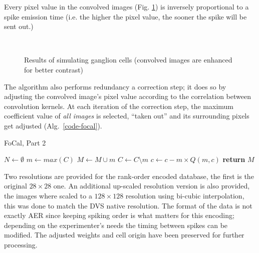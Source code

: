 Every pixel value in the convolved images (Fig. \ref{fig-convolution-results}) 
is inversely proportional to a spike emission time (i.e. the higher the pixel value, the sooner the spike will be sent out.)

\begin{figure}[hbt]
  \centering
  \\
  \caption{Results of simulating ganglion cells (convolved images are enhanced for better contrast)}
  \label{fig-convolution-results}
\end{figure}
The algorithm also performs redundancy a correction step; it does so by 
adjusting the convolved image's pixel value according to the correlation 
between convolution kernels. At each iteration of the correction step, the 
maximum coefficient value of \emph{all images} is selected, ``taken out'' and its 
surrounding pixels get adjusted (Alg.~\ref{code-focal}).
\begin{algorithm}[h]
  \caption{FoCal, Part 2}
  \label{code-focal-corr}
  \begin{algorithmic}
    \State $N \leftarrow \emptyset$ 
    \Repeat
    \State $m \leftarrow max(C)$
    \State $M \leftarrow M \cup m$
    \State $C \leftarrow C \setminus m$
     
     
    \State $c \leftarrow c - m \times Q(m, c)$
    \EndIf
    \EndFor
    \State \textbf{return} $M$
    \EndProcedure
  \end{algorithmic}
\end{algorithm}
Two resolutions are provided for the rank-order encoded database, the first is 
the original $28\times28$ one. An additional up-scaled resolution version is also provided, the images where scaled to a $128\times128$ resolution using bi-cubic interpolation, this was done to match the DVS native resolution. The format of the data is not exactly AER since keeping spiking order is what matters for this encoding; depending
on the experimenter's needs the timing between spikes can be modified. The adjusted weights and cell origin have been preserved for further processing.